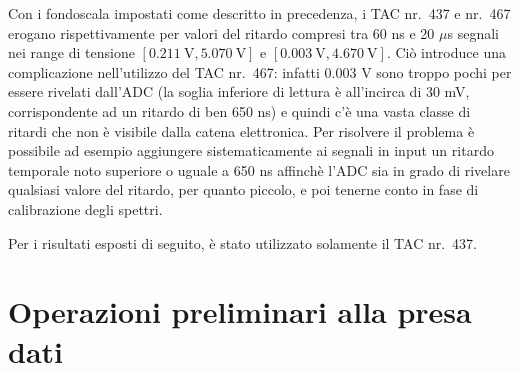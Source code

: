\documentclass[11pt, oneside, a4paper]{article}   	%
\begin{document}
%
%
%
%
Con i fondoscala impostati come descritto in precedenza, i TAC nr.~437 e nr.~467 erogano rispettivamente per valori del ritardo compresi tra 60 ns e 20 $\mu$s segnali nei range di tensione $[0.211 \ \mbox{V}, 5.070 \ \mbox{V}]$ e $[0.003 \ \mbox{V}, 4.670 \ \mbox{V}]$. Ciò introduce una complicazione nell'utilizzo del TAC nr.~467: infatti  0.003 V sono troppo pochi per essere rivelati dall'ADC (la soglia inferiore di lettura è all'incirca di 30 mV, corrispondente ad un ritardo di ben 650 ns) e quindi c'è una vasta classe di ritardi che non è visibile dalla catena elettronica. Per risolvere il problema è possibile ad esempio aggiungere sistematicamente ai segnali in input un ritardo temporale noto superiore o uguale a 650 ns affinchè l'ADC sia in grado di rivelare qualsiasi valore del ritardo, per quanto piccolo, e poi tenerne conto in fase di calibrazione degli spettri. 

Per i risultati esposti di seguito, è stato utilizzato solamente il TAC nr.~437.
%
%
\section{Operazioni preliminari alla presa dati}
\end{document}
